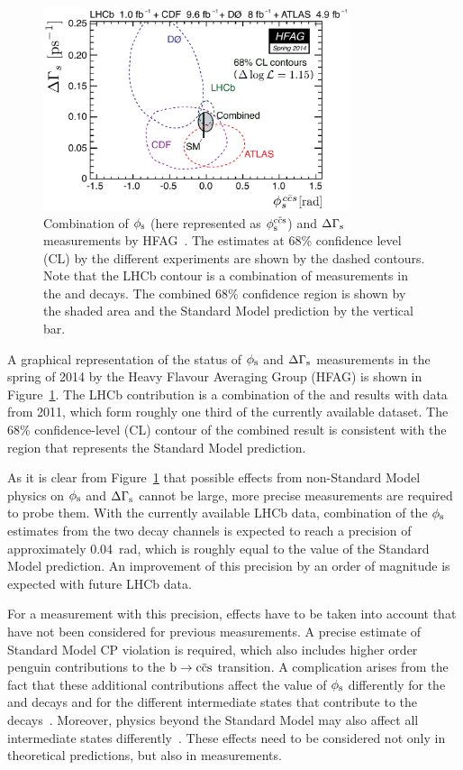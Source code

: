 \begin{figure}[tb]
  \centering
  \includegraphics[width=0.8\textwidth]{graphics/intro/hfag_spr2014_DGsphis_comb-crop-cmyk}
  \caption{Combination of $\phi_\text{s}$ (here represented as $\phisccs$) and $\Delta\Gamma_\text{s}$ measurements by HFAG~\cite{Amhis:2012bh}.
           The estimates at 68\% confidence level (CL) by the different experiments are shown by the dashed contours.
           Note that the LHCb contour is a combination of measurements in the \BstoJpsiphi{} and \BstoJpsipipi{} decays.
           The combined 68\% confidence region is shown by the shaded area and the Standard Model prediction by the vertical bar.}
  \label{fig:phisDGs}
\end{figure}
A graphical representation of the status of $\phi_\text{s}$ and $\Delta\Gamma_\text{s}$ measurements in the spring of 2014 by the Heavy Flavour Averaging Group
(HFAG) is shown in Figure~\ref{fig:phisDGs}. The LHCb contribution is a combination of the \BstoJpsiphi{} and \BstoJpsipipi{} results with
data from 2011, which form roughly one third of the currently available dataset. The 68\% confidence-level (CL) contour of the combined
result is consistent with the region that represents the Standard Model prediction.

As it is clear from Figure~\ref{fig:phisDGs} that possible effects from non-Standard Model physics on $\phi_\text{s}$ and $\Delta\Gamma_\text{s}$ cannot be large,
more precise measurements are required to probe them. With the currently available LHCb data, combination of the $\phi_\text{s}$ estimates from the
two decay channels is expected to reach a precision of approximately 0.04~rad, which is roughly equal to the value of the Standard Model
prediction. An improvement of this precision by an order of magnitude is expected with future LHCb data.

For a measurement with this precision, effects have to be taken into account that have not been considered for previous measurements. A
precise estimate of Standard Model CP violation is required, which also includes higher order penguin contributions to the $\btoccs$
transition. A complication arises from the fact that these additional contributions affect the value of $\phi_\text{s}$ differently for the
\BstoJpsiphi{} and \BstoJpsipipi{} decays and for the different intermediate states that contribute to the
decays~\cite{Faller:2008gt,*Bhattacharya:2012ph}. Moreover, physics beyond the Standard Model may also affect all intermediate states
differently~\cite{Chiang:2009ev,*Datta:2009fk}. These effects need to be considered not only in theoretical predictions, but also in
measurements.

